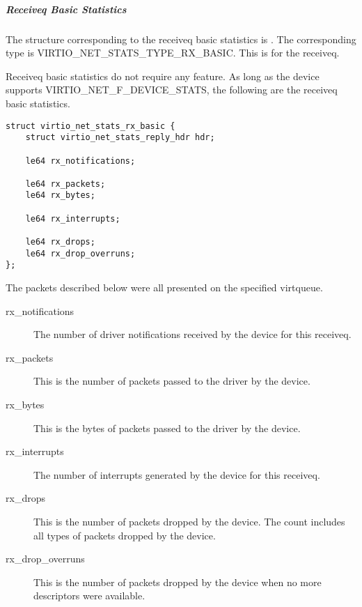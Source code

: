 \subparagraph{Receiveq Basic Statistics}\label{sec:Device Types / Network Device / Device Operation / Control Virtqueue / Device Statistics / Receiveq Basic Statistics}

The structure corresponding to the receiveq basic statistics is
. The corresponding type is
VIRTIO_NET_STATS_TYPE_RX_BASIC. This is for the receiveq.

Receiveq basic statistics do not require any feature. As long as the device supports
VIRTIO_NET_F_DEVICE_STATS, the following are the receiveq basic statistics.

\begin{lstlisting}
struct virtio_net_stats_rx_basic {
    struct virtio_net_stats_reply_hdr hdr;

    le64 rx_notifications;

    le64 rx_packets;
    le64 rx_bytes;

    le64 rx_interrupts;

    le64 rx_drops;
    le64 rx_drop_overruns;
};
\end{lstlisting}

The packets described below were all presented on the specified virtqueue.
\begin{description}
    \item [rx_notifications]
        The number of driver notifications received by the device for this
        receiveq.

    \item [rx_packets]
        This is the number of packets passed to the driver by the device.

    \item [rx_bytes]
        This is the bytes of packets passed to the driver by the device.

    \item [rx_interrupts]
        The number of interrupts generated by the device for this receiveq.

    \item [rx_drops]
        This is the number of packets dropped by the device. The count includes
        all types of packets dropped by the device.

    \item [rx_drop_overruns]
        This is the number of packets dropped by the device when no more
        descriptors were available.

\end{description}

